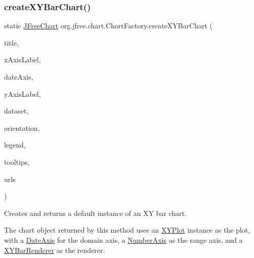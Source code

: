 \subsubsection{\texorpdfstring{create\+X\+Y\+Bar\+Chart()}{createXYBarChart()}\hspace{0.1cm}{\footnotesize\ttfamily [2/2]}}
{\footnotesize\ttfamily static \mbox{\hyperlink{classorg_1_1jfree_1_1chart_1_1_j_free_chart}{J\+Free\+Chart}} org.\+jfree.\+chart.\+Chart\+Factory.\+create\+X\+Y\+Bar\+Chart (\begin{DoxyParamCaption}\item[{String}]{title,  }\item[{String}]{x\+Axis\+Label,  }\item[{boolean}]{date\+Axis,  }\item[{String}]{y\+Axis\+Label,  }\item[{\mbox{\hyperlink{interfaceorg_1_1jfree_1_1data_1_1xy_1_1_interval_x_y_dataset}{Interval\+X\+Y\+Dataset}}}]{dataset,  }\item[{\mbox{\hyperlink{classorg_1_1jfree_1_1chart_1_1plot_1_1_plot_orientation}{Plot\+Orientation}}}]{orientation,  }\item[{boolean}]{legend,  }\item[{boolean}]{tooltips,  }\item[{boolean}]{urls }\end{DoxyParamCaption})\hspace{0.3cm}{\ttfamily [static]}}

Creates and returns a default instance of an XY bar chart. 

The chart object returned by this method uses an \mbox{\hyperlink{}{X\+Y\+Plot}} instance as the plot, with a \mbox{\hyperlink{}{Date\+Axis}} for the domain axis, a \mbox{\hyperlink{}{Number\+Axis}} as the range axis, and a \mbox{\hyperlink{}{X\+Y\+Bar\+Renderer}} as the renderer.


